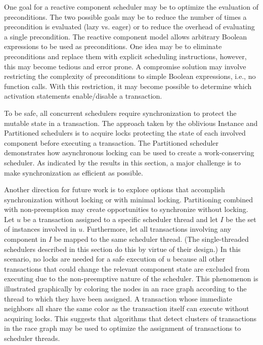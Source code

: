 One goal for a reactive component scheduler may be to optimize the evaluation of preconditions.
The two possible goals may be to reduce the number of times a precondition is evaluated (lazy vs. eager) or to reduce the overhead of evaluating a single precondition.
The reactive component model allows arbitrary Boolean expressions to be used as preconditions.
One idea may be to eliminate preconditions and replace them with explicit scheduling instructions, however, this may become tedious and error prone.
A compromise solution may involve restricting the complexity of preconditions to simple Boolean expressions, i.e., no function calls.
With this restriction, it may become possible to determine which activation statements enable/disable a transaction.

To be safe, all concurrent schedulers require synchronization to protect the mutable state in a transaction.
The approach taken by the oblivious Instance and Partitioned schedulers is to acquire locks protecting the state of each involved component before executing a transaction.
The Partitioned scheduler demonstrates how asynchronous locking can be used to create a work-conserving scheduler.
As indicated by the results in this section, a major challenge is to make synchronization as efficient as possible.

Another direction for future work is to explore options that accomplish synchronization without locking or with minimal locking.
Partitioning combined with non-preemption may create opportunities to synchronize without locking.
Let $u$ be a transaction assigned to a specific scheduler thread and let $I$ be the set of instances involved in $u$.
Furthermore, let all transactions involving any component in $I$ be mapped to the same scheduler thread.
(The single-threaded schedulers described in this section do this by virtue of their design.)
In this scenario, no locks are needed for a safe execution of $u$ because all other transactions that could change the relevant component state are excluded from executing due to the non-preemptive nature of the scheduler.
This phenomenon is illustrated graphically by coloring the nodes in an race graph according to the thread to which they have been assigned.
A transaction whose immediate neighbors all share the same color as the transaction itself can execute without acquiring locks.
This suggests that algorithms that detect clusters of transactions in the race graph may be used to optimize the assignment of transactions to scheduler threads.

